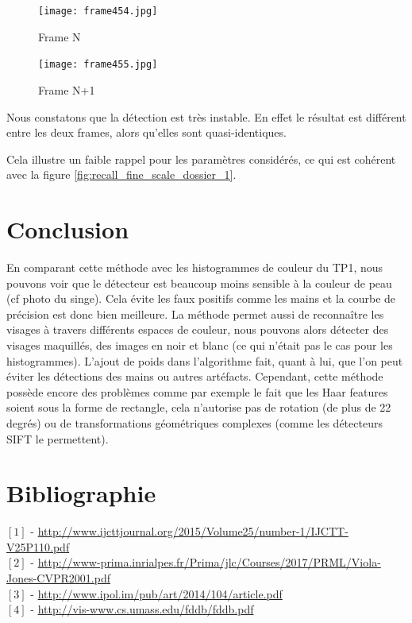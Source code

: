 \documentclass[a4paper,11pt]{article}
\begin{document}
\begin{figure}[H]
    \centering
    \begin{minipage}[c]{0.45\linewidth}
        \begin{center}
            \texttt{[image: frame454.jpg]}
            \caption{Frame N}
        \end{center}
    \end{minipage} \hfill
    \begin{minipage}[c]{0.45\linewidth}
        \begin{center}
            \texttt{[image: frame455.jpg]}
            \caption{Frame N+1}
        \end{center}
    \end{minipage}
\end{figure}

Nous constatons que la détection est très instable. En effet le résultat est différent entre les deux frames, alors qu'elles sont quasi-identiques.

Cela illustre un faible rappel pour les paramètres considérés, ce qui est cohérent avec la figure \ref{fig:recall_fine_scale_dossier_1}.

\section*{Conclusion}
    
    En comparant cette méthode avec les histogrammes de couleur du TP1, nous pouvons voir que le
    détecteur est beaucoup moins sensible à la couleur de peau (cf photo du singe). Cela évite les
    faux positifs comme les mains et la courbe de précision est donc bien meilleure. La méthode
    permet aussi de reconnaître les visages à travers différents espaces de couleur, nous pouvons
    alors détecter des visages maquillés, des images en noir et blanc (ce qui n'était pas le cas
    pour les histogrammes). L'ajout de poids dans l'algorithme fait, quant à lui, que l'on peut
    éviter les détections des mains ou autres artéfacts.
    Cependant, cette méthode possède encore des problèmes comme par exemple le fait que les Haar
    features soient sous la forme de rectangle, cela n'autorise pas de rotation (de plus de 22
    degrés)  ou de transformations géométriques complexes (comme les détecteurs SIFT le permettent). 

\section{Bibliographie}
\flushleft
$[1]$ - \url{http://www.ijcttjournal.org/2015/Volume25/number-1/IJCTT-V25P110.pdf} \\
$[2]$ - \url{http://www-prima.inrialpes.fr/Prima/jlc/Courses/2017/PRML/Viola-Jones-CVPR2001.pdf} \\
$[3]$ - \url{http://www.ipol.im/pub/art/2014/104/article.pdf} \\
$[4]$ - \url{http://vis-www.cs.umass.edu/fddb/fddb.pdf}
\end{document}
